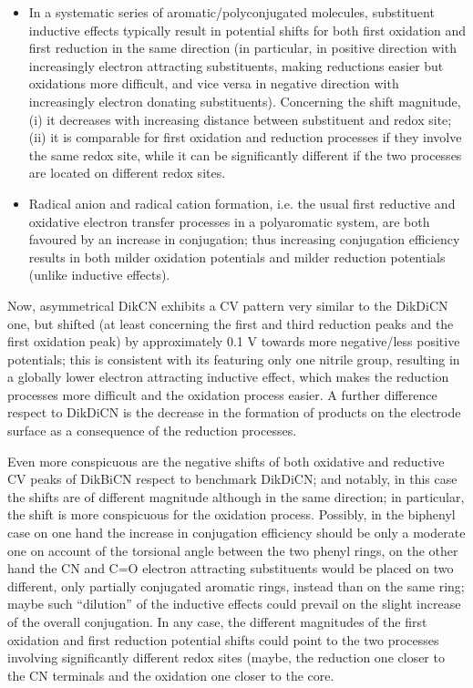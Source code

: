\documentclass[../Master.tex]{subfiles}
\begin{document}
\begin{itemize}
	\item In a systematic series of aromatic/polyconjugated molecules, substituent inductive effects typically result in potential shifts for both first oxidation and first reduction in the same direction (in particular, in positive direction with increasingly electron attracting substituents, making reductions easier but oxidations more difficult, and vice versa in negative direction with increasingly electron donating substituents). Concerning the shift magnitude, (i) it decreases with increasing distance between substituent and redox site; (ii) it is comparable for first oxidation and reduction processes if they involve the same redox site, while it can be significantly different if the two processes are located on different redox sites.
	\item Radical anion and radical cation formation, i.e. the usual first reductive and oxidative electron transfer processes in a polyaromatic system, are both favoured by an increase in conjugation; thus increasing conjugation efficiency results in both milder oxidation potentials and milder reduction potentials (unlike inductive effects).
\end{itemize}

Now, asymmetrical DikCN exhibits a CV pattern very similar to the DikDiCN one, but shifted (at least concerning the first and third reduction peaks and the first oxidation peak) by approximately 0.1 V towards more negative/less positive potentials; this is consistent with its featuring only one nitrile group, resulting in a globally lower electron attracting inductive effect, which makes the reduction processes more difficult and the oxidation process easier. A further difference respect to DikDiCN is the decrease in the formation of products on the electrode surface as a consequence of the reduction processes.

Even more conspicuous are the negative shifts of both oxidative and reductive CV peaks of DikBiCN respect to benchmark DikDiCN; and notably, in this case the shifts are of different magnitude although in the same direction; in particular, the shift is more conspicuous for the oxidation process. Possibly, in the biphenyl case on one hand the increase in conjugation efficiency should be only a moderate one on account of the torsional angle between the two phenyl rings, on the other hand the CN and C=O electron attracting substituents would be placed on two different, only partially conjugated aromatic rings, instead than on the same ring; maybe such “dilution” of the inductive effects could prevail on the slight increase of the overall conjugation. In any case, the different magnitudes of the first oxidation and first reduction potential shifts could point to the two processes involving significantly different redox sites (maybe, the reduction one closer to the CN terminals and the oxidation one closer to the core.
\end{document}
